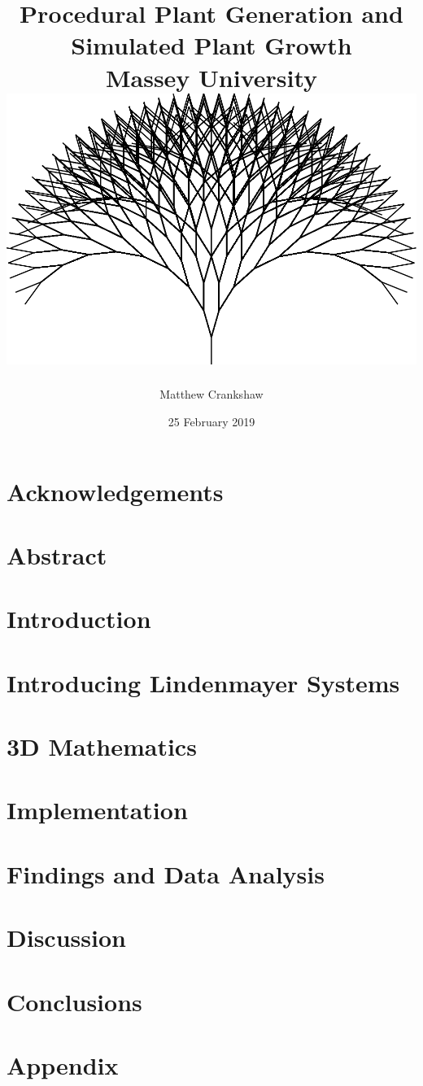 \documentclass[11pt]{report}
\title{
{ Procedural Plant Generation and Simulated Plant Growth }\\
{\large Massey University}
\\
\vspace{2cm}
{\includegraphics[scale=0.35]{titlepage.png}}
\vspace{2cm}
}
\author{Matthew Crankshaw}
\date{25 February 2019}
\begin{document}
\maketitle

\chapter*{Acknowledgements}

\chapter*{Abstract}

\tableofcontents
\listoffigures


\chapter{Introduction}


\chapter{Introducing Lindenmayer Systems}   


\chapter{3D Mathematics}


\chapter{Implementation}


\chapter{Findings and Data Analysis}


\chapter{Discussion}


\chapter{Conclusions}


\printglossary[type=\acronymtype]
\printglossary

\appendix
\chapter{Appendix}

\end{document}
